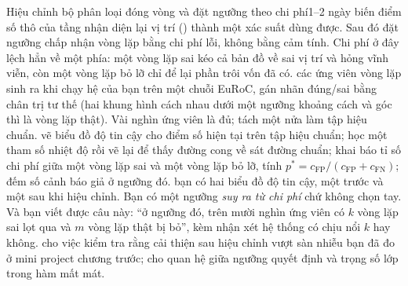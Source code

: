 \documentclass[../../deep_learning.tex]{subfiles}
\begin{document}
\begin{duan}{Hiệu chỉnh bộ phân loại đóng vòng và đặt ngưỡng theo chi phí}{1--2 ngày}
\dmt biến điểm số thô của tầng nhận diện lại vị trí () thành một xác suất dùng được. Sau đó đặt ngưỡng chấp nhận vòng lặp bằng chi phí lỗi, không bằng cảm tính. Chi phí ở đây lệch hẳn về một phía: một vòng lặp sai kéo cả bản đồ về sai vị trí và hỏng vĩnh viễn, còn một vòng lặp bỏ lỡ chỉ để lại phần trôi vốn đã có.
\ddl các ứng viên vòng lặp sinh ra khi chạy hệ của bạn trên một chuỗi EuRoC, gán nhãn đúng/sai bằng chân trị tư thế (hai khung hình cách nhau dưới một ngưỡng khoảng cách và góc thì là vòng lặp thật). Vài nghìn ứng viên là đủ; tách một nửa làm tập hiệu chuẩn.
\dbc vẽ biểu đồ độ tin cậy cho điểm số hiện tại trên tập hiệu chuẩn; học một tham số nhiệt độ rồi vẽ lại để thấy đường cong về sát đường chuẩn; khai báo tỉ số chi phí giữa một vòng lặp sai và một vòng lặp bỏ lỡ, tính \(p^{*}=c_{\mathrm{FP}}/(c_{\mathrm{FP}}+c_{\mathrm{FN}})\); đếm số cảnh báo giả ở ngưỡng đó.
\dxk bạn có hai biểu đồ độ tin cậy, một trước và một sau khi hiệu chỉnh. Bạn có một ngưỡng \emph{suy ra từ chi phí} chứ không chọn tay. Và bạn viết được câu này: ``ở ngưỡng đó, trên mười nghìn ứng viên có \(k\) vòng lặp sai lọt qua và \(m\) vòng lặp thật bị bỏ'', kèm nhận xét hệ thống có chịu nổi \(k\) hay không.
\dnv {} cho việc kiểm tra rằng cải thiện sau hiệu chỉnh vượt sàn nhiễu bạn đã đo ở mini project chương trước;  cho quan hệ giữa ngưỡng quyết định và trọng số lớp trong hàm mất mát.
\end{duan}

\begin{traloi}
\end{traloi}
\end{document}
